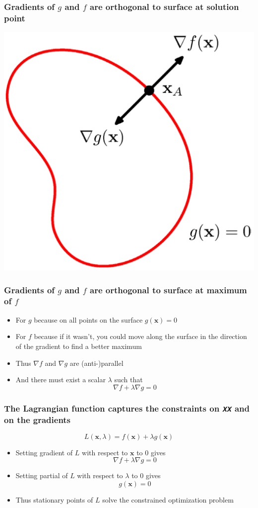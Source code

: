 \documentclass[12pt,notes,mathserif]{beamer}
\begin{document}
\begin{frame}[c]
\frametitle{Gradients of $g$ and $f$ are orthogonal to surface at solution point}
\begin{center}
\includegraphics[width=0.65\linewidth]{fig8/lec827.jpg}
\end{center}
\end{frame}



\begin{frame}[c]
\frametitle{Gradients of $g$ and $f$ are orthogonal to surface at maximum of $f$}
\begin{itemize}
\item For $g$ because on all points on the surface $g(\bm{x})=0$
\item For $f$ because if it wasn't, you could move along the surface in the direction of the gradient to find a better maximum
\item Thus $\nabla f$ and $\nabla g$ are (anti-)parallel
\item And there must exist a scalar $\lambda$ such that
\[
\nabla f+\lambda \nabla g=0
\]
\end{itemize}
\end{frame}

\begin{frame}[c]
\frametitle{The Lagrangian function captures the constraints on 𝑥𝑥 and on the gradients}
\[
L(\bm{x},\lambda)=f(\bm{x})+\lambda g(\bm{x})
\]
\begin{itemize}
\item Setting gradient of $L$ with respect to $\bm{x}$ to 0 gives
\[
\nabla f+\lambda \nabla g=0
\]
\item Setting partial of $L$ with respect to $\lambda$ to 0 gives
\[
g(\bm{x})=0
\]
\item Thus stationary points of $L$ solve the constrained optimization problem
\end{itemize}
\end{frame}
\end{document}
